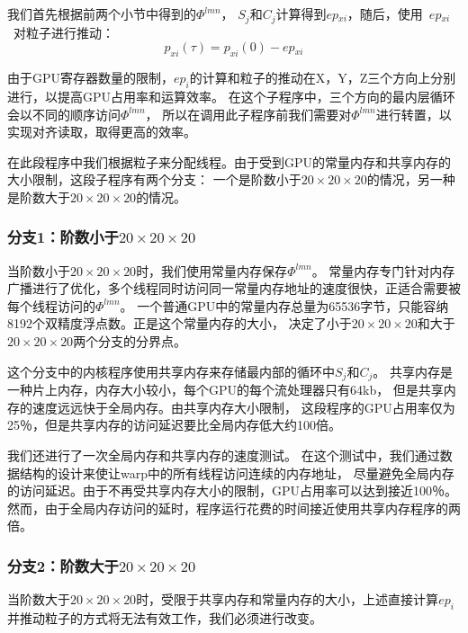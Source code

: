 我们首先根据前两个小节中得到的$\Phi^{lmn}$， $S_{j}^{{}}$和$C_{j}^{{}}$计算得到$ep{_{xi}}$，随后，使用~$ep{_{xi}}$~对粒子进行推动：
\begin{equation}\label{eq:symplectic_map4}
{{p}_{xi}}(\tau )={{p}_{xi}}(0)-ep{_{xi}}
\end{equation}

由于GPU寄存器数量的限制，$ep_{i}$的计算和粒子的推动在X，Y，Z三个方向上分别进行，以提高GPU占用率和运算效率。
在这个子程序中，三个方向的最内层循环会以不同的顺序访问$\Phi^{lmn}$，
所以在调用此子程序前我们需要对$ \Phi^{lmn} $进行转置，以实现对齐读取，取得更高的效率。

在此段程序中我们根据粒子来分配线程。由于受到GPU的常量内存和共享内存的大小限制，这段子程序有两个分支：
一个是阶数小于$20 \times 20 \times 20$的情况，另一种是阶数大于$20 \times 20 \times 20$的情况。

\subsubsection{分支1：阶数小于$20 \times 20 \times 20$}
当阶数小于$ 20\times20\times20 $时，我们使用常量内存保存$\Phi^{lmn}$。
常量内存专门针对内存广播进行了优化，多个线程同时访问同一常量内存地址的速度很快，正适合需要被每个线程访问的$\Phi^{lmn}$。
一个普通GPU中的常量内存总量为65536字节，只能容纳8192个双精度浮点数。正是这个常量内存的大小，
决定了小于$20 \times 20 \times 20$和大于$20 \times 20 \times 20$两个分支的分界点。

这个分支中的内核程序使用共享内存来存储最内部的循环中$S_{j}$和$C_{j}$。
共享内存是一种片上内存，内存大小较小，每个GPU的每个流处理器只有64kb，
但是共享内存的速度远远快于全局内存。由共享内存大小限制，
这段程序的GPU占用率仅为25％，但是共享内存的访问延迟要比全局内存低大约100倍。

我们还进行了一次全局内存和共享内存的速度测试。
在这个测试中，我们通过数据结构的设计来使让warp中的所有线程访问连续的内存地址，
尽量避免全局内存的访问延迟。由于不再受共享内存大小的限制，GPU占用率可以达到接近100％。
然而，由于全局内存访问的延时，程序运行花费的时间接近使用共享内存程序的两倍。

\subsubsection{分支2：阶数大于$20 \times 20 \times 20$}
当阶数大于$20 \times 20 \times 20$时，受限于共享内存和常量内存的大小，上述直接计算$ep_ {i}$并推动粒子的方式将无法有效工作，我们必须进行改变。

